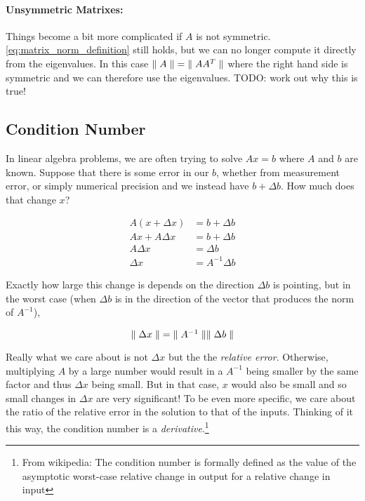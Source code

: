 \documentclass{article}
\newcommand{\norm}[1]{\mbox{\ensuremath{\parallel #1 \parallel}}}
\begin{document}
\paragraph{Unsymmetric Matrixes:}

Things become a bit more complicated if $A$ is not symmetric. \autoref{eq:matrix_norm_definition} still holds, but we can no longer compute it directly from the eigenvalues.
In this case $\norm{A} = \norm{A A^T}$ where the right hand side is symmetric and we can therefore use the eigenvalues.
TODO: work out why this is true!

\subsection{Condition Number}

In linear algebra problems, we are often trying to solve $Ax = b$ where $A$ and $b$ are known.
Suppose that there is some error in our $b$, whether from measurement error, or simply numerical precision and we instead have $b + \Delta b$.
How much does that change $x$?

\begin{align}
    A (x + \Delta x) & = b + \Delta b    \\
    Ax + A \Delta x  & = b + \Delta b    \\
    A \Delta x       & = \Delta b        \\
    \Delta x         & = A^{-1} \Delta b
\end{align}

\noindent
Exactly how large this change is depends on the direction $\Delta b$ is pointing, but in the worst case (when $\Delta b$ is in the direction of the vector that produces the norm of $A^{-1}$),

\begin{equation}
    \norm{\Delta x} = \norm{A^{-1}} \norm{\Delta b}
\end{equation}

\noindent
Really what we care about is not $\Delta x$ but the the {\em relative error\/}. Otherwise, multiplying $A$ by a large number would result in a $A^{-1}$ being smaller by the same factor and thus $\Delta x$ being small. But in that case, $x$ would also be small and so small changes in $\Delta x$ are very significant!
To be even more specific, we care about the ratio of the relative error in the solution to that of the inputs.
Thinking of it this way, the condition number is a {\em derivative\/}.\footnote{
    From wikipedia: The condition number is formally defined as the value of the asymptotic worst-case relative change in output for a relative change in input
}
\end{document}
